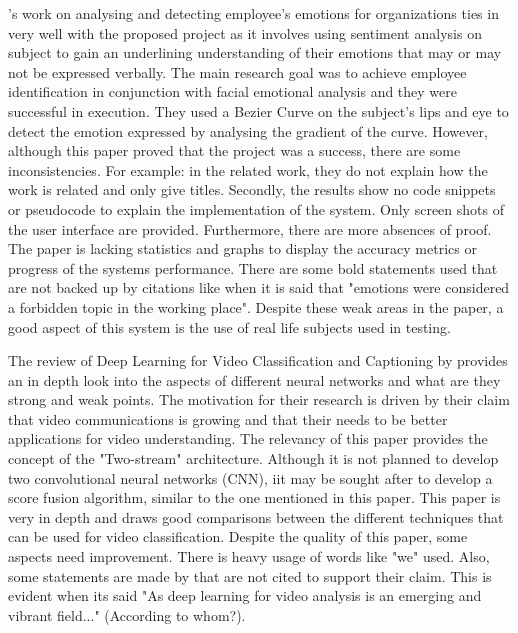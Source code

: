 \citealp{SUBHASHINI}'s work on analysing and detecting employee's emotions for organizations ties in very well with the proposed project as it involves using sentiment analysis on subject to gain an underlining understanding of their emotions that may or may not be expressed verbally. The main research goal was to achieve employee identification in conjunction with facial emotional analysis and they were successful in execution. They used a Bezier Curve on the subject's lips and eye to detect the emotion expressed by analysing the gradient of the curve. However, although this paper proved that the project was a success, there are some inconsistencies. For example: in the related work, they do not explain how the work is related and only give titles. Secondly, the results show no code snippets or pseudocode to explain the implementation of the system. Only screen shots of the user interface are provided. Furthermore, there are more absences of proof. The paper is lacking statistics and graphs to display the accuracy metrics or progress of the systems performance. There are some bold statements used that are not backed up by citations like when it is said that "emotions were considered a forbidden topic in the working place". Despite these weak areas in the paper, a good aspect of this system is the use of real life subjects used in testing. 

The review of Deep Learning for Video Classification and Captioning by \citeauthor{Wu} provides an in depth look into the aspects of different neural networks and what are they strong and weak points. The motivation for their research is driven by their claim that video communications is growing and that their needs to be better applications for video understanding. The relevancy of this paper provides the concept of the "Two-stream" architecture. Although it is not planned to develop two convolutional neural networks (CNN), iit may be sought after to develop a score fusion algorithm, similar to the one mentioned in this paper. This paper is very in depth and draws good comparisons between the different techniques that can be used for video classification. Despite the quality of this paper, some aspects need improvement. There is heavy usage of words like "we" used. Also, some statements are made by \citep{Wu} that are not cited to support their claim. This is evident when its said "As deep learning for video analysis is an emerging and vibrant field..." (According to whom?).

